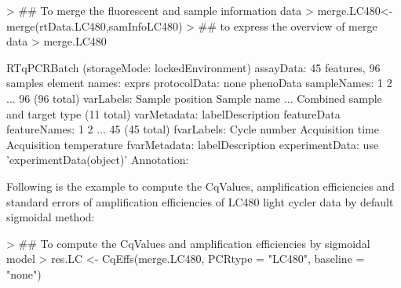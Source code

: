 \documentclass[11pt]{article}
\begin{document}
\begin{Schunk}
\begin{Sinput}
> ## To merge the fluorescent and sample information data
> merge.LC480<-merge(rtData.LC480,samInfoLC480) 
> ## to express the overview of merge data
> merge.LC480
\end{Sinput}
\begin{Soutput}
RTqPCRBatch (storageMode: lockedEnvironment)
assayData: 45 features, 96 samples 
  element names: exprs 
protocolData: none
phenoData
  sampleNames: 1 2 ... 96 (96 total)
  varLabels: Sample position Sample name ... Combined sample and target
    type (11 total)
  varMetadata: labelDescription
featureData
  featureNames: 1 2 ... 45 (45 total)
  fvarLabels: Cycle number Acquisition time Acquisition temperature
  fvarMetadata: labelDescription
experimentData: use 'experimentData(object)'
Annotation:  
\end{Soutput}
\end{Schunk}

Following is the example to compute the CqValues, amplification efficiencies and standard errors of amplification efficiencies of LC480 light cycler data by default sigmoidal method:

\begin{Schunk}
\begin{Sinput}
> ## To compute the CqValues and amplification efficiencies by sigmoidal model
> res.LC <- CqEffs(merge.LC480, PCRtype = "LC480", baseline = "none") 
\end{Sinput}
\end{Schunk}
\end{document}
